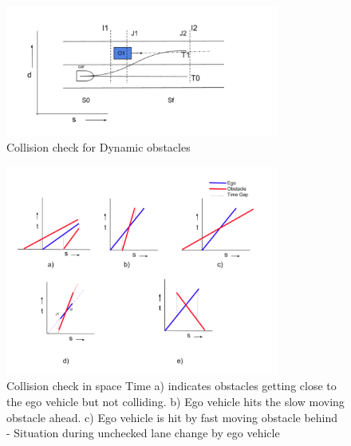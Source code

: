 


 \begin{figure}[H]
    \centering
    \includegraphics[width=0.8\textwidth]{Images/dynamic_check.png}
    \caption{Collision check for Dynamic obstacles}
    \label{dynamic_check}
\end{figure}



\begin{figure}[h]
    \centering
    \includegraphics[width=0.8\textwidth]{Images/dynamic_Check_time.png}
    \caption{Collision check in space Time a) indicates obstacles getting close to the ego vehicle but not colliding. b) Ego vehicle hits the slow moving obstacle ahead. c) Ego vehicle is hit by fast moving obstacle behind - Situation during unchecked lane change by ego vehicle }
    \label{dynamic_time_check}
\end{figure}



